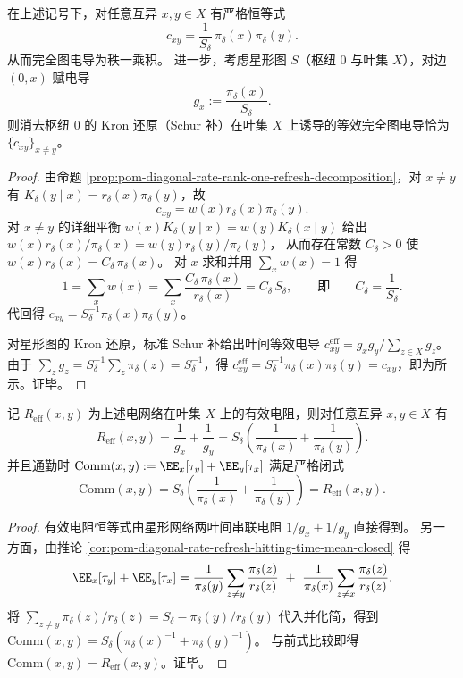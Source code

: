 \begin{proposition}[秩一电导与星形网络等价]\label{prop:pom-diagonal-rate-refresh-kron-star-equivalence}
在上述记号下，对任意互异 \(x,y\in X\) 有严格恒等式
\[
c_{xy}=\frac{1}{S_\delta}\,\pi_\delta(x)\pi_\delta(y).
\]
从而完全图电导为秩一乘积。
进一步，考虑星形图 \(S\)（枢纽 \(0\) 与叶集 \(X\)），对边 \((0,x)\) 赋电导
\[
g_x:=\frac{\pi_\delta(x)}{S_\delta}.
\]
则消去枢纽 \(0\) 的 Kron 还原（Schur 补）在叶集 \(X\) 上诱导的等效完全图电导恰为 \(\{c_{xy}\}_{x\ne y}\)。
\end{proposition}
\begin{proof}
由命题 \ref{prop:pom-diagonal-rate-rank-one-refresh-decomposition}，对 \(x\ne y\) 有 \(K_\delta(y\mid x)=r_\delta(x)\pi_\delta(y)\)，故
\[
c_{xy}=w(x)r_\delta(x)\pi_\delta(y).
\]
对 \(x\ne y\) 的详细平衡 \(w(x)K_\delta(y\mid x)=w(y)K_\delta(x\mid y)\) 给出
\(
w(x)r_\delta(x)/\pi_\delta(x)=w(y)r_\delta(y)/\pi_\delta(y)
\)，
从而存在常数 \(C_\delta>0\) 使 \(w(x)r_\delta(x)=C_\delta\,\pi_\delta(x)\)。
对 \(x\) 求和并用 \(\sum_x w(x)=1\) 得
\[
1=\sum_x w(x)=\sum_x \frac{C_\delta\,\pi_\delta(x)}{r_\delta(x)}=C_\delta\,S_\delta,
\qquad\text{即}\qquad C_\delta=\frac{1}{S_\delta}.
\]
代回得 \(c_{xy}=S_\delta^{-1}\pi_\delta(x)\pi_\delta(y)\)。
\par
对星形图的 Kron 还原，标准 Schur 补给出叶间等效电导
\(
c^{\mathrm{eff}}_{xy}=g_xg_y/\sum_{z\in X}g_z
\)。
由于 \(\sum_z g_z=S_\delta^{-1}\sum_z\pi_\delta(z)=S_\delta^{-1}\)，得
\(
c^{\mathrm{eff}}_{xy}=S_\delta^{-1}\pi_\delta(x)\pi_\delta(y)=c_{xy}
\)，即为所示。证毕。
\end{proof}

\begin{corollary}[有效电阻与通勤时的星形闭式]\label{cor:pom-diagonal-rate-refresh-commute-effective-resistance}
记 \(R_{\mathrm{eff}}(x,y)\) 为上述电网络在叶集 \(X\) 上的有效电阻，则对任意互异 \(x,y\in X\) 有
\[
R_{\mathrm{eff}}(x,y)=\frac{1}{g_x}+\frac{1}{g_y}
=S_\delta\left(\frac{1}{\pi_\delta(x)}+\frac{1}{\pi_\delta(y)}\right).
\]
并且通勤时
\(
\mathrm{Comm}(x,y):=\EE_x[\tau_y]+\EE_y[\tau_x]
\)
满足严格闭式
\[
\mathrm{Comm}(x,y)=S_\delta\left(\frac{1}{\pi_\delta(x)}+\frac{1}{\pi_\delta(y)}\right)
=R_{\mathrm{eff}}(x,y).
\]
\end{corollary}
\begin{proof}
有效电阻恒等式由星形网络两叶间串联电阻 \(1/g_x+1/g_y\) 直接得到。
另一方面，由推论 \ref{cor:pom-diagonal-rate-refresh-hitting-time-mean-closed} 得
\[
\EE_x[\tau_y]+\EE_y[\tau_x]
=\frac{1}{\pi_\delta(y)}\sum_{z\ne y}\frac{\pi_\delta(z)}{r_\delta(z)}
\ +\ \frac{1}{\pi_\delta(x)}\sum_{z\ne x}\frac{\pi_\delta(z)}{r_\delta(z)}.
\]
将 \(\sum_{z\ne y}\pi_\delta(z)/r_\delta(z)=S_\delta-\pi_\delta(y)/r_\delta(y)\) 代入并化简，得到
\(
\mathrm{Comm}(x,y)=S_\delta(\pi_\delta(x)^{-1}+\pi_\delta(y)^{-1})
\)。
与前式比较即得 \(\mathrm{Comm}(x,y)=R_{\mathrm{eff}}(x,y)\)。证毕。
\end{proof}

